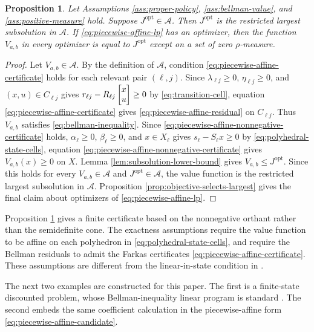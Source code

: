\documentclass{article}
\newtheorem{proposition}{Proposition}
\begin{document}
\begin{proposition}
\label{prop:piecewise-affine-exactness}
Let Assumptions \ref{ass:proper-policy}, \ref{ass:bellman-value}, and \ref{ass:positive-measure} hold. Suppose $J^\textrm{opt}\in\mathcal A$. Then $J^\textrm{opt}$ is the restricted largest subsolution in $\mathcal A$. If \eqref{eq:piecewise-affine-lp} has an optimizer, then the function $V_{a,b}$ in every optimizer is equal to $J^\textrm{opt}$ except on a set of zero $\rho$-measure.
\end{proposition}

\begin{proof}
Let $V_{a,b}\in\mathcal A$. By the definition of $\mathcal A$, condition \eqref{eq:piecewise-affine-certificate} holds for each relevant pair $(\ell,j)$. Since $\lambda_{\ell j}\geq 0$, $\eta_{\ell j}\geq 0$, and $(x,u)\in C_{\ell j}$ gives $r_{\ell j}-R_{\ell j}\begin{bmatrix} x\\u\end{bmatrix}\geq 0$ by \eqref{eq:transition-cell}, equation \eqref{eq:piecewise-affine-certificate} gives \eqref{eq:piecewise-affine-residual} on $C_{\ell j}$. Thus $V_{a,b}$ satisfies \eqref{eq:bellman-inequality}. Since \eqref{eq:piecewise-affine-nonnegative-certificate} holds, $\alpha_\ell\geq 0$, $\beta_\ell\geq 0$, and $x\in X_\ell$ gives $s_\ell-S_\ell x\geq 0$ by \eqref{eq:polyhedral-state-cells}, equation \eqref{eq:piecewise-affine-nonnegative-certificate} gives $V_{a,b}(x)\geq 0$ on $X$. Lemma \ref{lem:subsolution-lower-bound} gives $V_{a,b}\leq J^\textrm{opt}$. Since this holds for every $V_{a,b}\in\mathcal A$ and $J^\textrm{opt}\in\mathcal A$, the value function is the restricted largest subsolution in $\mathcal A$. Proposition \ref{prop:objective-selects-largest} gives the final claim about optimizers of \eqref{eq:piecewise-affine-lp}.
\end{proof}

Proposition \ref{prop:piecewise-affine-exactness} gives a finite certificate based on the nonnegative orthant rather than the semidefinite cone. The exactness assumptions require the value function to be affine on each polyhedron in \eqref{eq:polyhedral-state-cells}, and require the Bellman residuals to admit the Farkas certificates \eqref{eq:piecewise-affine-certificate}. These assumptions are different from the linear-in-state condition in \cite{pates-rantzer-cdc}.

The next two examples are constructed for this paper. The first is a finite-state discounted problem, whose Bellman-inequality linear program is standard \cite{manne-1960,bertsekas-2007}. The second embeds the same coefficient calculation in the piecewise-affine form \eqref{eq:piecewise-affine-candidate}.
\end{document}
